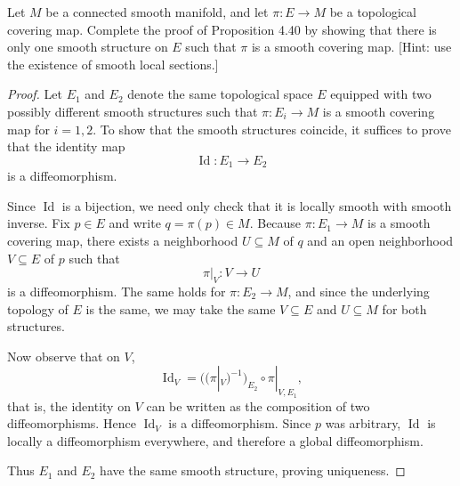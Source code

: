 \begin{problem}
    Let $M$ be a connected smooth manifold, and let $\pi \colon E \to M$ be a topological covering map. 
    Complete the proof of Proposition 4.40 by showing that there is only one smooth structure on $E$ such that 
    $\pi$ is a smooth covering map. [Hint: use the existence of smooth local sections.]
    \begin{proof}
        Let $E_1$ and $E_2$ denote the same topological space $E$ equipped with two possibly different smooth structures such that $\pi \colon E_i \to M$ is a smooth covering map for $i=1,2$.  
        To show that the smooth structures coincide, it suffices to prove that the identity map
        \[
        \operatorname{Id}\colon E_1 \to E_2
        \]
        is a diffeomorphism.

        Since $\operatorname{Id}$ is a bijection, we need only check that it is locally smooth with smooth inverse.  
        Fix $p \in E$ and write $q=\pi(p) \in M$. Because $\pi\colon E_1 \to M$ is a smooth covering map, there exists a neighborhood $U \subseteq M$ of $q$ and an open neighborhood $V \subseteq E$ of $p$ such that
        \[
        \pi|_V \colon V \to U
        \]
        is a diffeomorphism. The same holds for $\pi\colon E_2 \to M$, and since the underlying topology of $E$ is the same, we may take the same $V \subseteq E$ and $U \subseteq M$ for both structures.  

        Now observe that on $V$,
        \[
        \operatorname{Id}_V = \bigl((\pi|_V)^{-1}\bigr)_{E_2} \circ \pi|_{V,E_1},
        \]
        that is, the identity on $V$ can be written as the composition of two diffeomorphisms.  
        Hence $\operatorname{Id}_V$ is a diffeomorphism. Since $p$ was arbitrary, $\operatorname{Id}$ is locally a diffeomorphism everywhere, and therefore a global diffeomorphism.  

        Thus $E_1$ and $E_2$ have the same smooth structure, proving uniqueness.
    \end{proof}

\end{problem}

